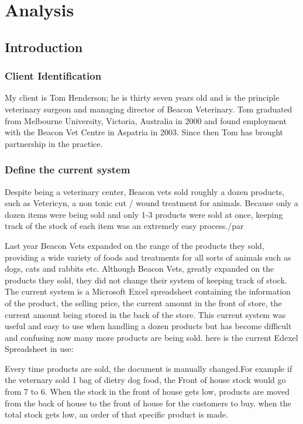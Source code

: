 \chapter{Analysis}

\section{Introduction}

\subsection{Client Identification}

	\begin{flushleft}

My client is Tom Henderson; he is thirty seven years old and is the principle veterinary surgeon and managing director of Beacon Veterinary. Tom graduated from Melbourne University, Victoria, Australia in 2000 and found employment with the Beacon Vet Centre in Aspatria in 2003. Since then Tom has brought partnership in the practice. \par


	\end{flushleft}

\subsection{Define the current system}

	\begin{flushleft}
Despite being a veterinary center, Beacon vets sold roughly a dozen products, such as Vetericyn, a non toxic cut / wound treatment for animals. Because only a dozen items were being sold and only 1-3 products were sold at once, keeping track of the stock of each item was an extremely easy process./par

Last year Beacon Vets expanded on the range of the products they sold, providing a wide variety of foods and treatments for all sorts of animals such as dogs, cats and rabbits etc. Although Beacon Vets, greatly expanded on the products they sold, they did not change their system of keeping track of stock. The current system is a Microsoft Excel spreadsheet containing the information of the product, the selling price, the current amount in the front of store, the current amount being stored in the back of the store. This current system was useful and easy to use when handling a dozen products but has become difficult and confusing now many more products are being sold. here is the current Edexel Spreadsheet in use:\par

Every time products are sold, the document is manually changed.For example if the veternary sold 1 bag of dietry dog food, the Front of house stock would go from 7 to 6. When the stock in the front of house gets low, products are moved from the back of house to the front of house for the customers to buy. when the total stock gets low, an order of that specific product is made.\par
	\end{flushleft}


